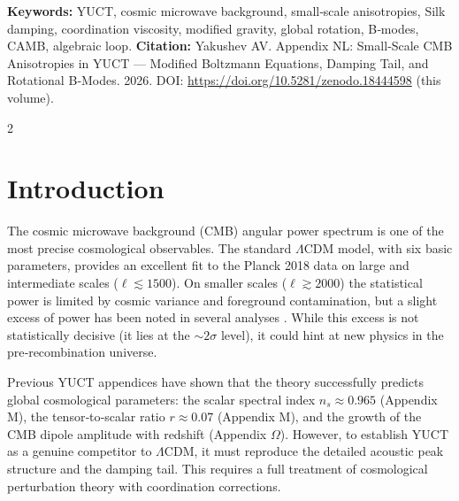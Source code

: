 \documentclass[11pt,a4paper]{article}
\begin{document}
	\vspace{0.1cm}
	\noindent
	{\color{darkblue}\textbf{Keywords:}} YUCT, cosmic microwave background, small‑scale anisotropies, Silk damping, coordination viscosity, modified gravity, global rotation, B‑modes, CAMB, algebraic loop.
	\vspace{0.1cm}
	\noindent
	{\color{darkblue}\textbf{Citation:}} Yakushev AV. Appendix NL: Small‑Scale CMB Anisotropies in YUCT — Modified Boltzmann Equations, Damping Tail, and Rotational B‑Modes. 2026. DOI: \url{https://doi.org/10.5281/zenodo.18444598} (this volume).
	
	\vspace{0.4cm}
	
	\begin{multicols}{2}
		
		\section{Introduction}
		
		The cosmic microwave background (CMB) angular power spectrum is one of the most precise cosmological observables. The standard $\Lambda$CDM model, with six basic parameters, provides an excellent fit to the Planck 2018 data on large and intermediate scales ($\ell \lesssim 1500$). On smaller scales ($\ell \gtrsim 2000$) the statistical power is limited by cosmic variance and foreground contamination, but a slight excess of power has been noted in several analyses \cite{Planck2018}. While this excess is not statistically decisive (it lies at the $\sim2\sigma$ level), it could hint at new physics in the pre‑recombination universe.
		
		Previous YUCT appendices have shown that the theory successfully predicts global cosmological parameters: the scalar spectral index $n_s \approx 0.965$ (Appendix M), the tensor‑to‑scalar ratio $r \approx 0.07$ (Appendix M), and the growth of the CMB dipole amplitude with redshift (Appendix $\Omega$). However, to establish YUCT as a genuine competitor to $\Lambda$CDM, it must reproduce the detailed acoustic peak structure and the damping tail. This requires a full treatment of cosmological perturbation theory with coordination corrections.
		

\end{multicols}
\end{document}
